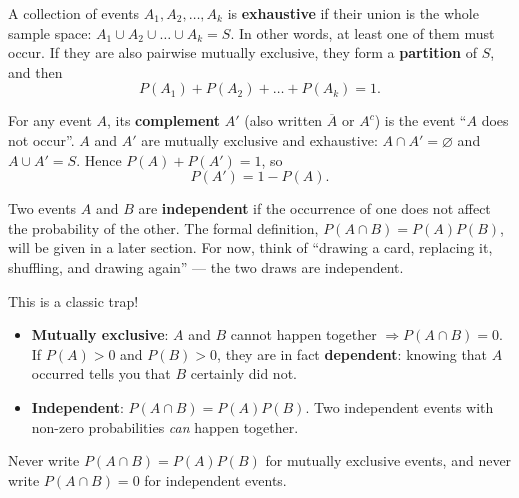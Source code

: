 \documentclass[11pt]{article}
\begin{document}
\begin{definition}
A collection of events $A_1, A_2, \dots, A_k$ is \textbf{exhaustive} if their union is the whole sample space: $A_1 \cup A_2 \cup \dots \cup A_k = S$. In other words, at least one of them must occur. If they are also pairwise mutually exclusive, they form a \textbf{partition} of $S$, and then
\[
P(A_1) + P(A_2) + \dots + P(A_k) = 1.
\]
\end{definition}

\begin{definition}
For any event $A$, its \textbf{complement} $A'$ (also written $\overline{A}$ or $A^c$) is the event ``$A$ does not occur''. $A$ and $A'$ are mutually exclusive and exhaustive: $A \cap A' = \varnothing$ and $A \cup A' = S$. Hence $P(A) + P(A') = 1$, so
\[
P(A') = 1 - P(A).
\]
\end{definition}

\begin{definition}
Two events $A$ and $B$ are \textbf{independent} if the occurrence of one does not affect the probability of the other. The formal definition, $P(A \cap B) = P(A)P(B)$, will be given in a later section. For now, think of ``drawing a card, replacing it, shuffling, and drawing again'' — the two draws are independent.
\end{definition}

\begin{attention}
This is a classic trap!
\begin{itemize}
\item \textbf{Mutually exclusive}: $A$ and $B$ cannot happen together $\Rightarrow P(A \cap B)=0$. If $P(A)>0$ and $P(B)>0$, they are in fact \textbf{dependent}: knowing that $A$ occurred tells you that $B$ certainly did not.
\item \textbf{Independent}: $P(A \cap B)=P(A)P(B)$. Two independent events with non-zero probabilities \emph{can} happen together.
\end{itemize}
Never write $P(A\cap B)=P(A)P(B)$ for mutually exclusive events, and never write $P(A\cap B)=0$ for independent events.
\end{attention}
\end{document}
